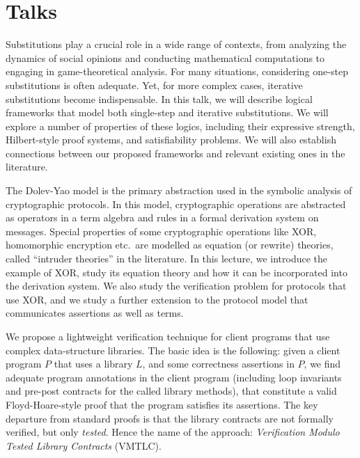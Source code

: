 \documentclass[a4paper,UKenglish]{dagrep-v2021}
\begin{document}
\section{Talks}


Substitutions play a crucial role in a wide range of contexts, from analyzing the dynamics of social opinions and conducting mathematical computations to engaging in game-theoretical analysis. For many situations, considering one-step substitutions is often adequate. Yet, for more complex cases, iterative substitutions become indispensable. In this talk, we will describe logical frameworks that model both single-step and iterative substitutions. We will explore a number of properties of these logics, including their expressive strength, Hilbert-style proof systems, and satisfiability problems. We will also establish connections between our proposed frameworks and relevant existing ones in the literature.


The Dolev-Yao model is the primary abstraction used in the symbolic analysis of cryptographic protocols. In this model, cryptographic operations are abstracted as operators in a term algebra and rules in a formal derivation system on messages. Special properties of some cryptographic operations like XOR, homomorphic encryption etc.\ are modelled as equation (or rewrite) theories, called ``intruder theories'' in the literature. In this lecture, we introduce the example of XOR, study its equation theory and how it can be incorporated into the derivation system. We also study the verification problem for protocols that use XOR, and we study a further extension to the protocol model that communicates assertions as well as terms.


We propose a lightweight verification technique for client programs that use complex data-structure libraries. The basic idea is the following: given a client program $P$ that uses a library $L$, and some correctness assertions in $P$, we find adequate program annotations in the client program (including loop invariants and pre-post contracts for the called library methods), that constitute a valid Floyd-Hoare-style proof that the program satisfies its assertions. The key departure from standard proofs is that the library contracts are not formally verified, but only \emph{tested}. Hence the name of the approach: \emph{Verification Modulo Tested Library Contracts} (VMTLC).
\end{document}
